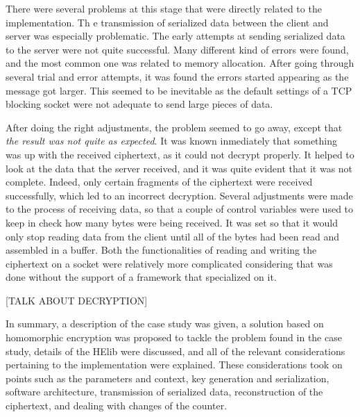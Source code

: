 There were several problems at this stage that were directly related to the implementation. Th
e transmission of serialized data between the client and server was especially problematic. The early attempts at sending serialized data to the server were not quite successful. Many different kind of errors were found, and the most common one was related to memory allocation. After going through several trial and error attempts, it was found the errors started appearing as the message got larger. This seemed to be inevitable as the default settings of a TCP blocking socket were not adequate to send large pieces of data. 

After doing the right adjustments, the problem seemed to go away, except that \textit{the result was not quite as expected}. It was known inmediately that something was up with the received ciphertext, as it could not decrypt properly. It helped to look at the data that the server received, and it was quite evident that it was not complete. Indeed, only certain fragments of the ciphertext were received successfully, which led to an incorrect decryption. Several adjustments were made to the process of receiving data, so that a couple of control variables were used to keep in check how many bytes were being received. It was set so that it would only stop reading data from the client until all of the bytes had been read and assembled in a buffer. Both the functionalities of reading and writing the ciphertext on a socket were relatively more complicated considering that was done without the support of a framework that specialized on it.

[TALK ABOUT DECRYPTION]

In summary, a description of the case study was given, a solution based on homomorphic encryption was proposed to tackle the problem found in the case study, details of the HElib were discussed, and all of the relevant considerations pertaining to the implementation were explained. These considerations took on points such as the parameters and context, key generation and serialization, software architecture, transmission of serialized data, reconstruction of the ciphertext, and dealing with changes of the counter. 


\clearpage

